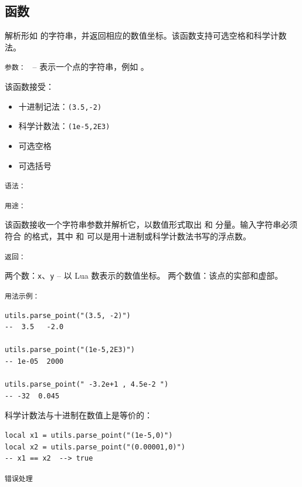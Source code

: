 \subsection{函数 }
\label{sub:function_utils_parse_point}

解析形如  的字符串，并返回相应的数值坐标。该函数支持可选空格和科学计数法。

\medskip
\texttt{参数： }  – 表示一个点的字符串，例如 。

该函数接受：
\begin{itemize}
\item 十进制记法：\texttt{(3.5,-2)}
\item 科学计数法：\texttt{(1e-5,2E3)}
\item 可选空格
\item 可选括号
\end{itemize}

\medskip
\texttt{语法： }

\begin{center}
\end{center}

\medskip
\texttt{用途： }

该函数接收一个字符串参数并解析它，以数值形式取出  和  分量。输入字符串必须符合  的格式，其中  和  可以是用十进制或科学计数法书写的浮点数。


\medskip
\texttt{返回： }

两个数：\texttt{x}、\texttt{y} – 以 Lua 数表示的数值坐标。
两个数值：该点的实部和虚部。


\medskip
\texttt{用法示例： }

\begin{verbatim}
utils.parse_point("(3.5, -2)")
--  3.5   -2.0

utils.parse_point("(1e-5,2E3)")
-- 1e-05  2000

utils.parse_point(" -3.2e+1 , 4.5e-2 ")
-- -32  0.045
\end{verbatim}

科学计数法与十进制在数值上是等价的：

\begin{verbatim}
local x1 = utils.parse_point("(1e-5,0)")
local x2 = utils.parse_point("(0.00001,0)")
-- x1 == x2  --> true
\end{verbatim}

\medskip
\texttt{错误处理}

